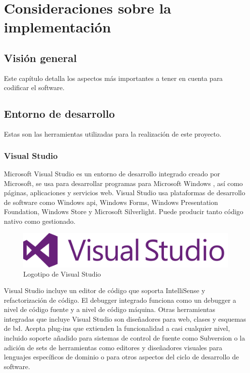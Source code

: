 \chapter{Consideraciones sobre la implementación}

\section{Visión general}

Este capítulo detalla los aspectos más importantes a tener en cuenta para codificar el software.

\section{Entorno de desarrollo}

Estas son las herramientas utilizadas para la realización de este proyecto.

\subsection{Visual Studio}

Microsoft Visual Studio\cite{VisualStudio} es un entorno de desarrollo integrado creado por Microsoft, se usa para desarrollar programas para Microsoft Windows , así como páginas, aplicaciones y servicios web. Visual Studio usa plataformas de desarrollo de software como Windows \acrshort{api}, Windows Forms, Windows Presentation Foundation, Windows Store y Microsoft Silverlight. Puede producir tanto código nativo como gestionado.

\begin{figure}[!htp]
	 \centering
	 \includegraphics[scale=1.0]{fig/visualstudio_logo}
	 \caption{Logotipo de Visual Studio}
\end{figure}

Visual Studio incluye un editor de código que soporta IntelliSense y refactorización de código. El debugger integrado funciona como un debugger a nivel de código fuente y a nivel de código máquina. Otras herramientas integradas que incluye Visual Studio son diseñadores para web, clases y esquemas de \acrshort{bd}. Acepta plug-ins que extienden la funcionalidad a casi cualquier nivel, incluido soporte añadido para sistemas de control de fuente como Subversion o la adición de sets de herramientas como editores y diseñadores visuales para lenguajes específicos de dominio o para otros aspectos del ciclo de desarrollo de software.

